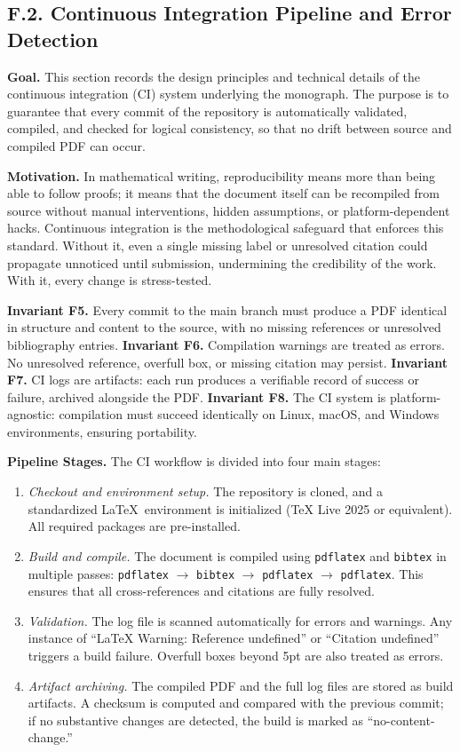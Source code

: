 \subsection*{F.2. Continuous Integration Pipeline and Error Detection}

\noindent \textbf{Goal.} This section records the design principles and technical details of the continuous integration (CI) system underlying the monograph. The purpose is to guarantee that every commit of the repository is automatically validated, compiled, and checked for logical consistency, so that no drift between source and compiled PDF can occur.

\medskip
\noindent \textbf{Motivation.} In mathematical writing, reproducibility means more than being able to follow proofs; it means that the document itself can be recompiled from source without manual interventions, hidden assumptions, or platform-dependent hacks. Continuous integration is the methodological safeguard that enforces this standard. Without it, even a single missing label or unresolved citation could propagate unnoticed until submission, undermining the credibility of the work. With it, every change is stress-tested.

\medskip
\noindent \textbf{Invariant F5.} Every commit to the main branch must produce a PDF identical in structure and content to the source, with no missing references or unresolved bibliography entries.  
\textbf{Invariant F6.} Compilation warnings are treated as errors. No unresolved reference, overfull box, or missing citation may persist.  
\textbf{Invariant F7.} CI logs are artifacts: each run produces a verifiable record of success or failure, archived alongside the PDF.  
\textbf{Invariant F8.} The CI system is platform-agnostic: compilation must succeed identically on Linux, macOS, and Windows environments, ensuring portability.  

\medskip
\noindent \textbf{Pipeline Stages.} The CI workflow is divided into four main stages:

\begin{enumerate}
  \item \emph{Checkout and environment setup.} The repository is cloned, and a standardized \LaTeX\ environment is initialized (TeX Live 2025 or equivalent). All required packages are pre-installed.
  \item \emph{Build and compile.} The document is compiled using \texttt{pdflatex} and \texttt{bibtex} in multiple passes: \texttt{pdflatex} $\to$ \texttt{bibtex} $\to$ \texttt{pdflatex} $\to$ \texttt{pdflatex}. This ensures that all cross-references and citations are fully resolved.
  \item \emph{Validation.} The log file is scanned automatically for errors and warnings. Any instance of “LaTeX Warning: Reference undefined” or “Citation undefined” triggers a build failure. Overfull boxes beyond 5pt are also treated as errors.
  \item \emph{Artifact archiving.} The compiled PDF and the full log files are stored as build artifacts. A checksum is computed and compared with the previous commit; if no substantive changes are detected, the build is marked as “no-content-change.”
\end{enumerate}

